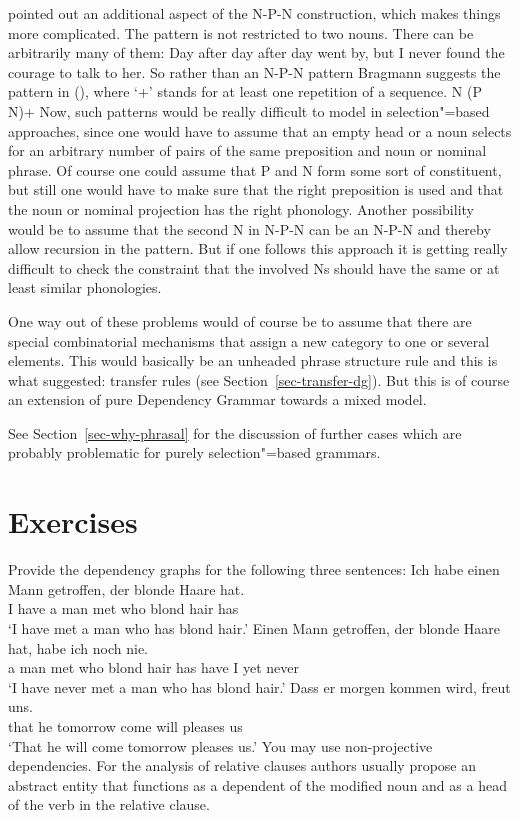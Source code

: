 \citet{Bragmann2015a} pointed out an additional aspect of the N-P-N construction, which makes things
more complicated. The pattern is not restricted to two nouns. There can be arbitrarily many of them:
\ea
Day after day after day went by, but I never found the courage to talk to her.
\z
So rather than an N-P-N pattern Bragmann suggests the pattern in (), where `+'\is{$+$} stands for at
least one repetition of a sequence.
\ea
\label{n-p-n-plus-cx}
N (P N)+
\z
Now, such patterns would be really difficult to model in selection"=based approaches, since one
would have to assume that an empty head or a noun selects for an arbitrary number of pairs of the
same preposition and noun or nominal phrase. Of course one could assume that P and N form some sort
of constituent, but still one would have to make sure that the right preposition is used and that the
noun or nominal projection has the right phonology. Another possibility would be to assume that the
second N in N-P-N can be an N-P-N and thereby allow recursion in the pattern. But if one follows
this approach it is getting really difficult to check the constraint that the involved Ns should
have the same or at least similar phonologies.

One way out of these problems would of course be to assume that there are special combinatorial
mechanisms that assign a new category to one or several elements. This would basically be an
unheaded phrase structure rule and this is what \tes suggested: transfer rules (see
Section~\ref{sec-transfer-dg}). But this is of course an extension of pure Dependency Grammar
towards a mixed model.

See Section~\ref{sec-why-phrasal} for the discussion of further cases which are probably problematic
for purely selection"=based grammars.

\section*{Exercises}

Provide the dependency graphs for the following three sentences:
\eal
\ex 
\gll Ich habe einen Mann getroffen, der blonde Haare hat.\\
     I have a man met who blond hair has\\
\glt `I have met a man who has blond hair.'
\ex 
\gll Einen Mann getroffen, der blonde Haare hat, habe ich noch nie.\\
     a man met who blond hair has have I yet never\\
\glt `I have never met a man who has blond hair.'
\ex 
\gll Dass er morgen kommen wird, freut uns.\\
     that he tomorrow come will pleases us\\
\glt `That he will come tomorrow pleases us.'
\zl
You may use non-projective dependencies. For the analysis of relative clauses authors usually propose
an abstract entity that functions as a dependent of the modified noun and as a head of the verb in
the relative clause.

